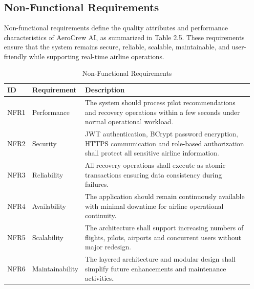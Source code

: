 \documentclass[12pt,a4paper]{report}
\begin{document}
\subsection{Non-Functional Requirements}

Non-functional requirements define the quality attributes and performance characteristics of AeroCrew AI, as summarized in Table 2.5. These requirements ensure that the system remains secure, reliable, scalable, maintainable, and user-friendly while supporting real-time airline operations.

\begin{table}[H]
\centering
\caption{Non-Functional Requirements}

\begin{tabular}{|p{2cm}|p{4cm}|p{8cm}|}

\hline

\textbf{ID} & \textbf{Requirement} & \textbf{Description}\\

\hline

NFR1 & Performance &
The system should process pilot recommendations and recovery operations within a few seconds under normal operational workload.\\

\hline

NFR2 & Security &
JWT authentication, BCrypt password encryption, HTTPS communication and role-based authorization shall protect all sensitive airline information.\\

\hline

NFR3 & Reliability &
All recovery operations shall execute as atomic transactions ensuring data consistency during failures.\\

\hline

NFR4 & Availability &
The application should remain continuously available with minimal downtime for airline operational continuity.\\

\hline

NFR5 & Scalability &
The architecture shall support increasing numbers of flights, pilots, airports and concurrent users without major redesign.\\

\hline

NFR6 & Maintainability &
The layered architecture and modular design shall simplify future enhancements and maintenance activities.\\


\end{tabular}
\end{table}
\end{document}
